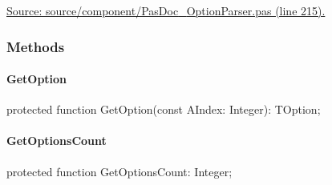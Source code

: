 \documentclass{report}
\newif\ifpdf
\begin{document}
\begin{list}{}
\begin{flushleft}
\ifpdf
\end{flushleft}
\fi


\par  \par
\href{https://github.com/pasdoc/pasdoc/blob/master/source/component/PasDoc_OptionParser.pas#L215}{Source: source/component/PasDoc{\_}OptionParser.pas (line 215).}\end{list}
\subsubsection*{\large{\textbf{Methods}}\normalsize\hspace{1ex}\hfill}
\paragraph*{GetOption}\hspace*{\fill}

\label{PasDoc_OptionParser.TOptionParser-GetOption}
\begin{list}{}{
\setlength{\itemindent}{0cm}
\setlength{\listparindent}{0cm}
\setlength{\leftmargin}{\evensidemargin}
\addtolength{\leftmargin}{\tmplength}
\settowidth{\labelsep}{X}
\addtolength{\leftmargin}{\labelsep}
\setlength{\labelwidth}{\tmplength}
}
\item[\textbf{Declaration}\hfill]
\ifpdf
\begin{flushleft}
\fi
\begin{ttfamily}
protected function GetOption(const AIndex: Integer): TOption;\end{ttfamily}

\ifpdf
\end{flushleft}
\fi

\end{list}
\paragraph*{GetOptionsCount}\hspace*{\fill}

\label{PasDoc_OptionParser.TOptionParser-GetOptionsCount}
\begin{list}{}{
\setlength{\itemindent}{0cm}
\setlength{\listparindent}{0cm}
\setlength{\leftmargin}{\evensidemargin}
\addtolength{\leftmargin}{\tmplength}
\settowidth{\labelsep}{X}
\addtolength{\leftmargin}{\labelsep}
\setlength{\labelwidth}{\tmplength}
}
\item[\textbf{Declaration}\hfill]
\ifpdf
\begin{flushleft}
\fi
\begin{ttfamily}
protected function GetOptionsCount: Integer;\end{ttfamily}

\ifpdf
\end{flushleft}
\fi

\end{list}
\end{document}

